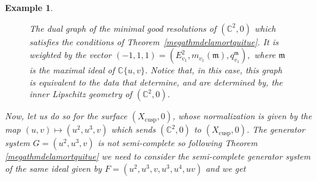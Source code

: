 \documentclass[reqno,dvipsnames,12pt]{amsart}
\newtheorem{exam}[thm]{Example}
\begin{document}
\begin{exam}
\begin{itemize}
\begin{figure}[H]
\begin{tikzpicture}[node distance=4.5cm, very thick]
                                      
  \end{tikzpicture} 
  \caption{The  dual graph of the minimal good resolutions of  $(\mathbb{C}^2,0)$  which  satisfies the conditions of Theorem~\ref{megathmdelamortquitue}. It is weighted by the vector $(-1,1,1)=(E_{v_1}^2,m_{v_{1}}(\mathfrak{m}),q_{v_1}^{\mathfrak{m}}),$ where $\mathfrak{m}$ is the maximal ideal of $\mathbb{C}\{u,v\}$. Notice that, in this case, this graph is equivalent to the data that determine, and are determined by, the inner Lipschitz geometry of $(\mathbb{C}^2,0)$. }
 \end{figure}
          Now, let us do so for the surface    $(X_{\mathrm{cusp}},0)$, whose normalization is given by the map $(u,v)\mapsto(u^2,u^3,v)$ which sends $(\mathbb{C}^2,0)$ to $(X_{\mathrm{cusp}},0)$. The generator system $G=(u^2,u^3,v)$ is not semi-complete so following Theorem \ref{megathmdelamortquitue} we need to consider the semi-complete generator system of the same ideal given by $F=(u^2,u^3,v,u^3,u^4,uv)$ and we get

   \begin{figure}[H]
   \centering
{}
\end{figure}
\end{itemize}
\end{exam}
\end{document}
